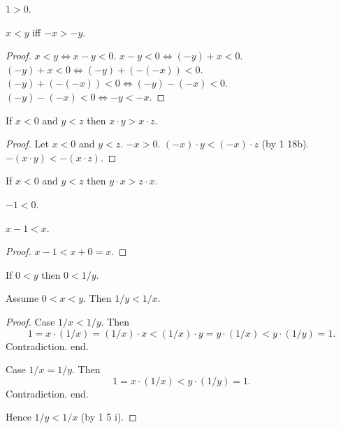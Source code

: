 \documentclass{article}
\begin{document}
\begin{forthel}
\begin{proposition}[1 18 dd]
$1 > 0$.
\end{proposition}

\begin{proposition}
$x < y$ iff $-x > -y$.
\end{proposition}
\begin{proof}
$x < y \iff x - y < 0$.
$x - y < 0 \iff (-y) + x < 0$.
$(-y) + x < 0 \iff (-y)+(-(-x)) < 0$.
$(-y)+(-(-x)) < 0 \iff (-y)-(-x) < 0$.
$(-y)-(-x) < 0 \iff -y < -x$.
\end{proof}

\begin{proposition}[1 18 c]
If $x < 0$ and $y < z$ then
$x \cdot y > x \cdot z$.
\end{proposition}
\begin{proof}
Let $x < 0$ and $y < z$.
$-x > 0$.
$(-x)\cdot y < (-x)\cdot z$ (by 1 18b).
$-(x\cdot y) < -(x\cdot z)$.
\end{proof}

\begin{proposition}[1 18 cc]
If $x < 0$ and $y < z$ then
$y \cdot x > z \cdot x$.
\end{proposition}

\begin{proposition}
$-1 < 0$.
\end{proposition}

\begin{proposition}
$x - 1 < x$.
\end{proposition}
\begin{proof}
$x - 1 < x + 0 = x$.
\end{proof}

\begin{proposition}[1 18 e]
If $0 < y$ then $0 < 1/y$.
\end{proposition}

\begin{proposition}[1 18 ee]
Assume $0 < x < y$.
Then $1/y < 1/x$.
\end{proposition}
\begin{proof}
Case $1/x < 1/y$.
Then
\[ 1 = x \cdot (1/x) = (1/x) \cdot x < (1/x) \cdot y =
y \cdot (1/x) < y \cdot (1/y) = 1. \]
Contradiction. end.

Case $1/x = 1/y$. Then
\[ 1 = x \cdot (1/x) < y \cdot (1/y) = 1. \]
Contradiction. end.

Hence $1/y < 1/x$ (by 1 5 i).
\end{proof}

\end{forthel}
\end{document}
